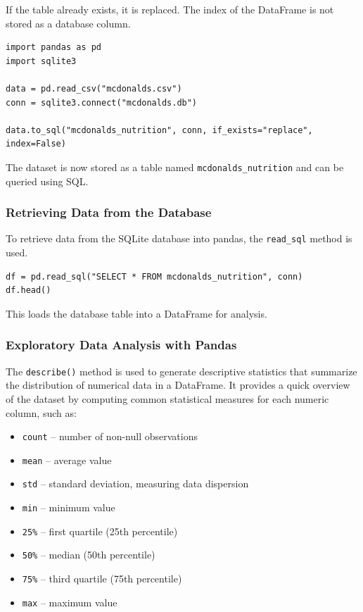\documentclass{article}
\begin{document}
If the table already exists, it is replaced. The index of the DataFrame is not stored as a database column.

\begin{verbatim}
import pandas as pd
import sqlite3

data = pd.read_csv("mcdonalds.csv")
conn = sqlite3.connect("mcdonalds.db")

data.to_sql("mcdonalds_nutrition", conn, if_exists="replace", index=False)
\end{verbatim}
The dataset is now stored as a table named \texttt{mcdonalds\_nutrition} and can be queried using SQL.

\subsubsection{Retrieving Data from the Database}

To retrieve data from the SQLite database into pandas, the \texttt{read\_sql} method is used.

\begin{verbatim}
df = pd.read_sql("SELECT * FROM mcdonalds_nutrition", conn)
df.head()
\end{verbatim}
This loads the database table into a DataFrame for analysis.

\subsubsection{Exploratory Data Analysis with Pandas}
The \texttt{describe()} method is used to generate descriptive statistics that summarize the distribution of numerical data in a DataFrame.
It provides a quick overview of the dataset by computing common statistical measures for each numeric column, such as:

\begin{itemize}
    \item \texttt{count} – number of non-null observations
    \item \texttt{mean} – average value
    \item \texttt{std} – standard deviation, measuring data dispersion
    \item \texttt{min} – minimum value
    \item \texttt{25\%} – first quartile (25th percentile)
    \item \texttt{50\%} – median (50th percentile)
    \item \texttt{75\%} – third quartile (75th percentile)
    \item \texttt{max} – maximum value
\end{itemize}
\end{document}
